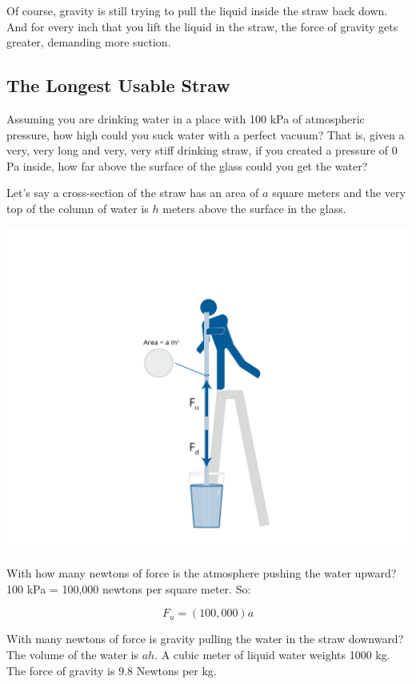 Of course,  gravity is still trying to pull the liquid inside the straw back down.  And for every inch that you lift the liquid in the straw,  the force of gravity gets greater, demanding more suction.

\subsection{The Longest Usable Straw}
  
Assuming you are drinking water in a place with 100 kPa of atmospheric pressure,   how high could 
you suck water with a perfect vacuum?  That is,  given a very, very long and very, very stiff drinking straw,  if you created a pressure of 0 Pa inside,  how far above the surface of the glass 
could you get the water?

Let's say a cross-section of the straw has an area of $a$ square meters and the very top of the 
column of water is $h$ meters above the surface in the glass. 

\includegraphics[width=\textwidth]{tallStraw.png}


With how many newtons of force is the atmosphere pushing the water upward?  100 kPa = 100,000 newtons per square meter.  So:

$$F_u = (100,000)a$$

With many newtons of force is gravity pulling the water in the straw downward?  The volume of the water is $ah$.  A cubic meter of liquid water weights 1000 kg.  The force of gravity is 9.8 Newtons per kg.

